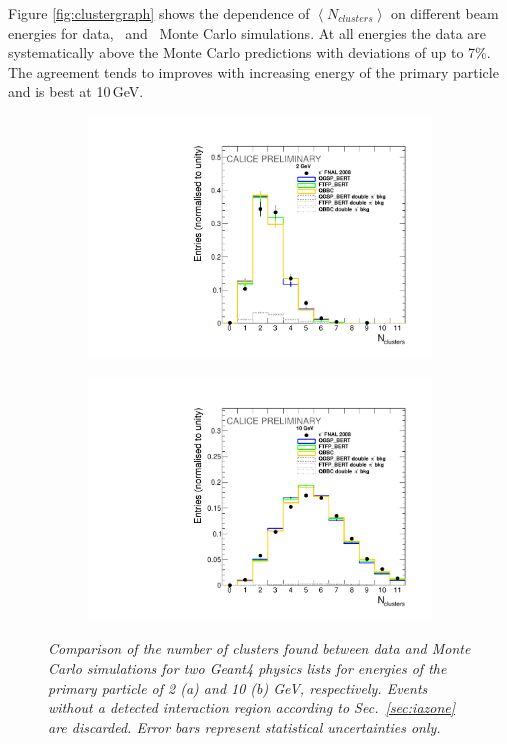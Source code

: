 Figure \ref{fig:clustergraph} shows the dependence of $\left<N_{clusters}\right>$  on different beam energies for data, \ftfp\ and \qgsp\ Monte Carlo simulations. At all energies the data are systematically above the Monte Carlo predictions with deviations of up to 7\%. The agreement tends to improves with increasing energy of the primary particle and is best at 10\,GeV. 
\begin{figure}
	\centering
	\begin{subfigure}{0.5\textwidth}
		\centering
		\includegraphics[width=.90\linewidth]{ECAL/plots/cluster-2.pdf}
		\caption{\label{fig:cl2} }
	\end{subfigure}%
	\begin{subfigure}{0.5\textwidth}
		\centering
		\includegraphics[width=.90\linewidth]{ECAL/plots/cluster-10.pdf}
		\caption{\label{fig:cl10} }
	\end{subfigure}
	\caption{\label{fig:clusterexample} \sl Comparison of the number of clusters found between data and Monte Carlo simulations for two {\sc Geant}4 physics lists for energies of the primary particle of 2 (a) and 10 (b) GeV, respectively. Events without a detected interaction region according to Sec.~\ref{sec:iazone} are discarded. Error bars represent statistical uncertainties only.}
\end{figure}

